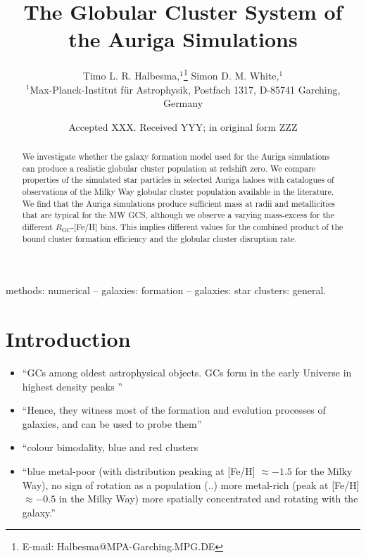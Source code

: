 \documentclass[a4paper,fleqn,usenatbib]{mnras}
\title[Auriga GCS]{The Globular Cluster System of the Auriga Simulations}
\author[T. L. R. Halbesma et al.]{
Timo L. R. Halbesma,$^{1}$\thanks{E-mail: Halbesma@MPA-Garching.MPG.DE}
Simon D. M. White,$^{1}$
\\
$^{1}$Max-Planck-Institut f\"ur Astrophysik, Postfach 1317, D-85741 Garching, Germany\\
}
\date{Accepted XXX. Received YYY; in original form ZZZ}
\begin{document}
\label{firstpage}
\pagerange{\pageref{firstpage}--\pageref{lastpage}}
\maketitle

\begin{abstract}
We investigate whether the galaxy formation model used for the Auriga simulations 
can produce a realistic globular cluster population at redshift zero. We compare
properties of the simulated star particles in selected Auriga haloes with
catalogues of observations of the Milky Way globular cluster population available
in the literature. We find that the Auriga simulations produce sufficient mass
at radii and metallicities that are typical for the MW GCS, although we observe
a varying mass-excess for the different $R_{\text{GC}}$-[Fe/H] bins. This implies
different values for the combined product of the bound cluster formation efficiency
and the globular cluster disruption rate.
\end{abstract}

\begin{keywords}
methods: numerical -- galaxies: formation -- galaxies: star clusters: general.
\end{keywords}



\section{Introduction}
\begin{itemize}
    \item ``GCs among oldest astrophysical objects. GCs form in the early Universe in highest density peaks \citep[e.g.][]{2005MNRAS.364..367D, 2009ApJ...706L.192B}''
    \item ``Hence, they witness most of the formation and evolution processes of galaxies, and can be used to probe them'' \citep{2006ARA&A..44..193B}
    \item ``colour bimodality, blue and red clusters \citep[e.g.][]{1985ApJ...293..424Z, 1999AJ....118.1526G, 2001AJ....121.2974L, 2006ApJ...639...95P}
    \item ``blue metal-poor (with distribution peaking at [Fe/H] $\approx -1.5$ for the Milky Way), no sign of rotation as a population (..) more metal-rich (peak at [Fe/H] $\approx -0.5$ in the Milky  Way) more spatially concentrated and rotating with the galaxy.'' \citep{1996AJ....112.1487H}
\end{itemize}
\end{document}
